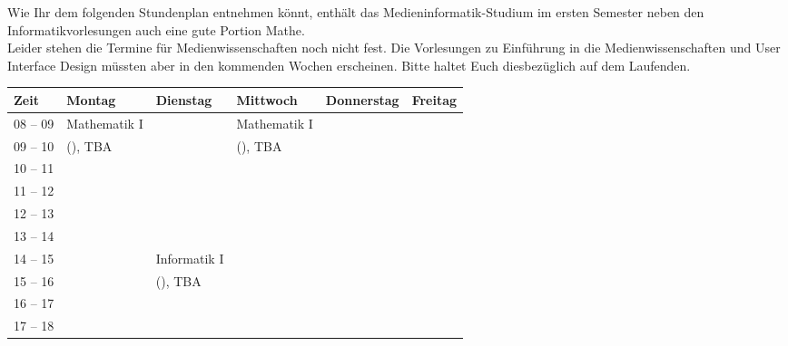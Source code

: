 
Wie Ihr dem folgenden Stundenplan entnehmen könnt, enthält das Medieninformatik-Studium im ersten
Semester neben den Informatikvorlesungen auch eine gute Portion Mathe.\\ %
Leider stehen die Termine für Medienwissenschaften noch nicht fest. Die Vorlesungen zu Einführung in die Medienwissenschaften und User Interface Design müssten aber in den kommenden Wochen erscheinen. Bitte haltet Euch diesbezüglich auf dem Laufenden.\\

\begin{minipage}{\textwidth}
    \footnotesize
\begin{center}
	\begin{table}[]
	\begin{tabular}{|l|l|l|l|l|l|}
	\hline
	 Zeit     &    Montag                    & Dienstag          & Mittwoch          & Donnerstag & Freitag \\ \hline\hline
	 08 -- 09 &    Mathematik I              &                   & Mathematik I      &  &  \\ \cline{1-1} \cline{3-3} \cline{5-6} 
	 09 -- 10 &    (\Matheprof), TBA         &                   & (\Matheprof), TBA &  &  \\ \hline
	 10 -- 11 &                              &                   &                   &  &  \\ \cline{1-1} \cline{3-6} 
	 11 -- 12 &                              &                   &                   &  &  \\ \hline
	 12 -- 13 &                              &                   &                   &  &  \\ \hline
	 13 -- 14 &                              &                   &                   &  &  \\ \hline
	 14 -- 15 &                              & Informatik I      &                   &  &  \\ \cline{1-2} \cline{4-6} 
	 15 -- 16 &                              & (\Infoprof), TBA  &                   &  &  \\ \hline
	 16 -- 17 &                              &                   &                   &  &  \\ \hline
	 17 -- 18 &                              &                   &                   &  &  \\ \hline
	\end{tabular}
	\end{table}


\end{center}
\end{minipage}


